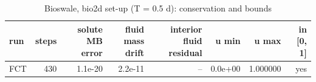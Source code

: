 \begin{table}[h]
\centering
\caption{Bioswale, bio2d set-up (T = 0.5 d): conservation and bounds}
\begin{tabular}{lrrrrrrr}
\hline
run & steps & solute MB error & fluid mass drift & interior fluid residual & u min & u max & in [0, 1] \\
\hline
FCT & 430 & 1.1e-20 & 2.2e-11 & -- & 0.0e+00 & 1.000000 & yes \\
\hline
\end{tabular}
\end{table}
